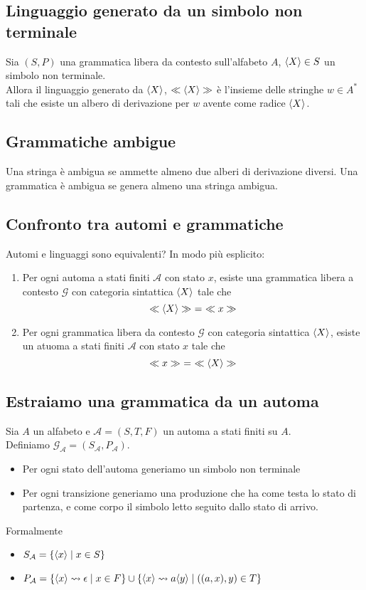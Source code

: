 \documentclass{article}
\begin{document}
\subsection*{Linguaggio generato da un simbolo non terminale}
Sia \((S,P)\) una grammatica libera da contesto sull'alfabeto \(A\), \(\langle X \rangle \in S\) un simbolo non terminale. \\
Allora il linguaggio generato da \(\langle X \rangle\), \(\ll \langle X \rangle \gg\) è l'insieme delle stringhe \(w \in A^*\) tali che esiste un albero di derivazione per \(w\) avente come radice \(\langle X \rangle\).
\subsection*{Grammatiche ambigue}
Una stringa è ambigua se ammette almeno due alberi di derivazione diversi. Una grammatica è ambigua se genera almeno una stringa ambigua.

\subsection{Confronto tra automi e grammatiche}
Automi e linguaggi sono equivalenti? In modo più esplicito:
\begin{enumerate}
    \item Per ogni automa a stati finiti \(\mathcal{A}\) con stato \(x\), esiste una grammatica libera a contesto \(\mathcal{G}\) con categoria sintattica \(\langle X \rangle\) tale che
          \[\ll \langle X \rangle \gg\ =\ \ll x \gg\]
    \item Per ogni grammatica libera da contesto \(\mathcal{G}\) con categoria sintattica \(\langle X \rangle\), esiste un atuoma a stati finiti \(\mathcal{A}\) con stato \(x\) tale che
          \[\ll x \gg\ =\ \ll \langle X \rangle \gg\]
\end{enumerate}
\subsection*{Estraiamo una grammatica da un automa}
Sia \(A\) un alfabeto e \(\mathcal{A} = (S,T,F)\) un automa a stati finiti su \(A\). \\
Definiamo \(\mathcal{G}_\mathcal{A} = (S_\mathcal{A}, P_\mathcal{A})\).
\begin{itemize}
    \item Per ogni stato dell'automa generiamo un simbolo non terminale
    \item Per ogni transizione generiamo una produzione che ha come testa lo stato di partenza, e come corpo il simbolo letto seguito dallo stato di arrivo.
\end{itemize}
Formalmente
\begin{itemize}
    \item \(S_\mathcal{A} = \{\langle x \rangle \mid x \in S\}\)
    \item \(P_\mathcal{A} = \{\langle x \rangle \leadsto \epsilon \mid x \in F\} \cup \{\langle x \rangle \leadsto a\langle y \rangle \mid ((a,x),y) \in T\}\)
\end{itemize}
\end{document}
